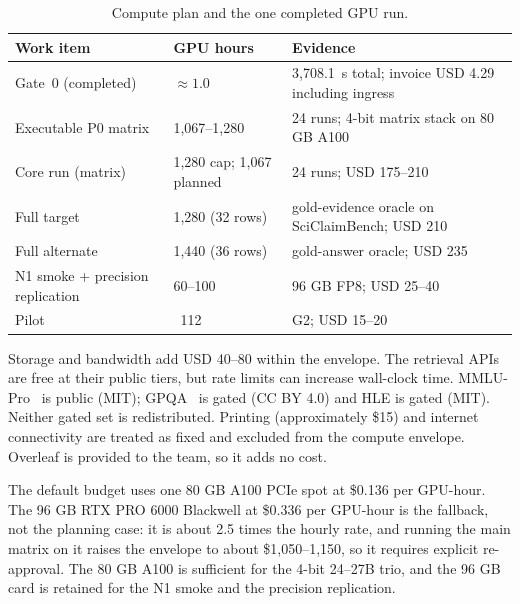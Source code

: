 \begin{center}
    \begin{table}[ht]
        \centering
        \caption{Compute plan and the one completed GPU run.}
        \renewcommand{\arraystretch}{1.6}
        \begin{tabular}{|p{}|p{}|p{}|}
            \hline
            Work item                              & GPU hours          & Evidence                          \\
            \hline
            Gate~0 (completed)                     & $\approx 1.0$      & 3,708.1~s total; invoice USD 4.29 including ingress \\
            \hline
            Executable P0 matrix                   & 1,067--1,280       & 24 runs; 4-bit matrix stack on 80 GB A100 \\
            \hline
            Core run (matrix)                      & 1,280 cap; 1,067 planned & 24 runs; USD 175--210 \\
            \hline
            Full target                      & 1,280 (32 rows)       & gold-evidence oracle on SciClaimBench; USD 210 \\
            \hline
            Full alternate                   & 1,440 (36 rows)       & gold-answer oracle; USD 235 \\
            \hline
            N1 smoke + precision replication & 60--100              & 96 GB FP8; USD 25--40 \\
            \hline
            Pilot                            & ~112                  & G2; USD 15--20 \\
            \hline
        \end{tabular}
        \label{tab:budget-phase}
    \end{table}
\end{center}

Storage and bandwidth add USD 40--80 within the envelope. The retrieval APIs are free at their public tiers, but rate limits can increase wall-clock time. MMLU-Pro~\cite{wang2024mmlupro} is public (MIT); GPQA~\cite{rein2024gpqa} is gated (CC BY 4.0) and HLE is gated (MIT). Neither gated set is redistributed. Printing (approximately \$15) and internet connectivity are treated as fixed and excluded from the compute envelope. Overleaf is provided to the team, so it adds no cost.

The default budget uses one 80 GB A100 PCIe spot at \$0.136 per GPU-hour. The 96 GB RTX PRO 6000 Blackwell at \$0.336 per GPU-hour is the fallback, not the planning case: it is about 2.5 times the hourly rate, and running the main matrix on it raises the envelope to about \$1,050--1,150, so it requires explicit re-approval. The 80 GB A100 is sufficient for the 4-bit 24--27B trio, and the 96 GB card is retained for the N1 smoke and the precision replication.

